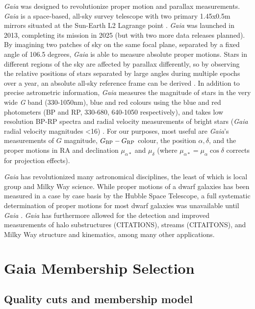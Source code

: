 \emph{Gaia} was designed to revolutionize proper motion and parallax
measurements. \emph{Gaia} is a space-based, all-sky survey telescope
with two primary 1.45x0.5m mirrors situated at the Sun-Earth L2 Lagrange
point \citep{gaiacollaboration+2016}. \emph{Gaia} was launched in 2013,
completing its mission in 2025 (but with two more data releases
planned). By imagining two patches of sky on the same focal plane,
separated by a fixed angle of 106.5 degrees, \emph{Gaia} is able to
measure absolute proper motions. Stars in different regions of the sky
are affected by parallax differently, so by observing the relative
positions of stars separated by large angles during multiple epochs over
a year, an absolute all-sky reference frame can be derived
\citep{gaiacollaboration+2016}. In addition to precise astrometric
information, \emph{Gaia} measures the magnitude of stars in the very
wide \emph{G} band (330-1050nm), blue and red colours using the blue and
red photometers (BP and RP, 330-680, 640-1050 respectively), and takes
low resolution BP-RP spectra and radial velocity measurements of bright
stars (\emph{Gaia} radial velocity magnitudes \textless16)
\citep{gaiacollaboration+2016}. For our purposes, most useful are
\emph{Gaia}'s measurements of \(G\) magnitude,
\(G_{\rm BP} - G_{\rm RP}\) colour, the position \(\alpha, \delta\), and
the proper motions in RA and declination \(\mu_{\alpha*}\) and
\(\mu_\delta\) (where \(\mu_{\alpha*} = \mu_\alpha \cos \delta\)
corrects for projection effects).

\emph{Gaia} has revolutionized many astronomical disciplines, the least
of which is local group and Milky Way science. While proper motions of a
dwarf galaxies has been measured in a case by case basis by the Hubble
Space Telescope, a full systematic determination of proper motions for
most dwarf galaxies was unavailable until \emph{Gaia}
\citep{MV2020a, battaglia+2022}. \emph{Gaia} has furthermore allowed for
the detection and improved measurements of halo substructures
(CITATIONS), streams (CITAITONS), and Milky Way structure and
kinematics, among many other applications.

\section{Gaia Membership Selection}\label{gaia-membership-selection}

\subsection{Quality cuts and membership
model}\label{quality-cuts-and-membership-model}

